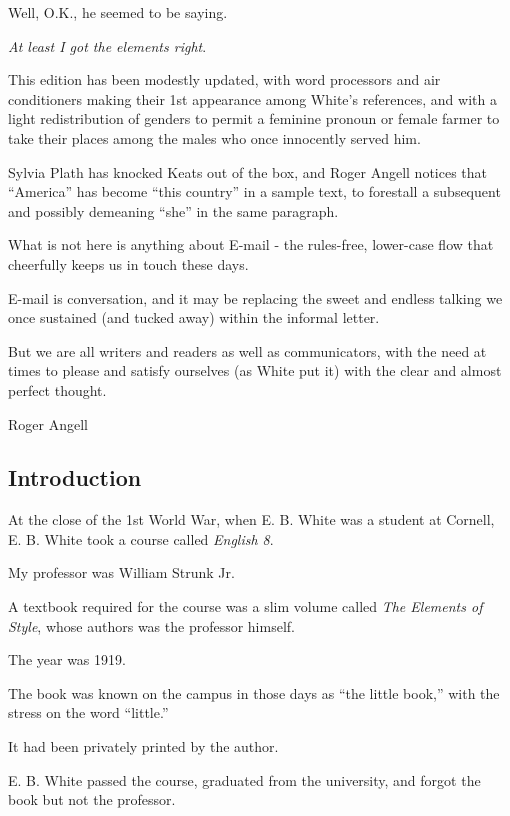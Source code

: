 \documentclass{article}
\begin{document}
Well, O.K., he seemed to be saying.

{\it At least I got the elements right}.

%
This edition has been modestly updated, with word processors and air conditioners making their 1st appearance among White's references, and with a light redistribution of genders to permit a feminine pronoun or female farmer to take their places among the males who once innocently served him.

Sylvia Plath has knocked Keats out of the box, and Roger Angell notices that ``America'' has become ``this country'' in a sample text, to forestall a subsequent and possibly demeaning ``she'' in the same paragraph.

What is not here is anything about E-mail - the rules-free, lower-case flow that cheerfully keeps us in touch these days.

E-mail is conversation, and it may be replacing the sweet and endless talking we once sustained (and tucked away) within the informal letter.

But we are all writers and readers as well as communicators, with the need at times to please and satisfy ourselves (as White put it) with the clear and almost perfect thought.

\begin{flushright}
	Roger Angell
\end{flushright}


\subsection*{Introduction}

At the close of the 1st World War, when E. B. White was a student at Cornell, E. B. White took a course called {\it English 8}.

My professor was William Strunk Jr.

A textbook required for the course was a slim volume called {\it The Elements of Style}, whose authors was the professor himself.

The year was 1919.

The book was known on the campus in those days as ``the little book,'' with the stress on the word ``little.''

It had been privately printed by the author.

%
E. B. White passed the course, graduated from the university, and forgot the book but not the professor.
\end{document}
